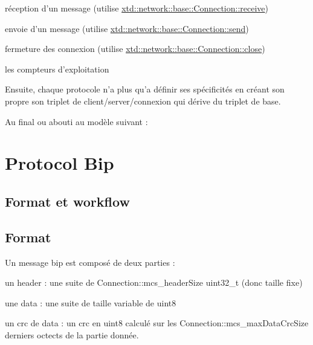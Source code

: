 \begin{DoxyItemize}
\begin{DoxyItemize}
\item réception d'un message (utilise \hyperlink{classxtd_1_1network_1_1base_1_1Connection_a09146c9c2dbf1ad85867fd0afab15c0c}{xtd\-::network\-::base\-::\-Connection\-::receive})
\item envoie d'un message (utilise \hyperlink{classxtd_1_1network_1_1base_1_1Connection_a8ebc5958cf7d27a902bd75a55c4648bf}{xtd\-::network\-::base\-::\-Connection\-::send})
\item fermeture des connexion (utilise \hyperlink{classxtd_1_1network_1_1base_1_1Connection_a73097d339a3716c05fee7ee19753ee4a}{xtd\-::network\-::base\-::\-Connection\-::close})
\item les compteurs d'exploitation
\end{DoxyItemize}
\end{DoxyItemize}

Ensuite, chaque protocole n'a plus qu'a définir ses spécificités en créant son propre son triplet de client/server/connexion qui dérive du triplet de base.\par
 Au final ou abouti au modèle suivant \-:



\par


 \hypertarget{index_sec_bip}{}\section{Protocol Bip}\label{index_sec_bip}




\par
 \hypertarget{index_ssec_bip_cnx}{}\subsection{Format et workflow}\label{index_ssec_bip_cnx}
\subsection*{Format }

Un message bip est composé de deux parties \-:
\begin{DoxyItemize}
\item un header \-: une suite de Connection\-::mcs\-\_\-header\-Size uint32\-\_\-t (donc taille fixe)
\item une data \-: une suite de taille variable de uint8
\item un crc de data \-: un crc en uint8 calculé sur les Connection\-::mcs\-\_\-max\-Data\-Crc\-Size derniers octects de la partie donnée.
\end{DoxyItemize}

